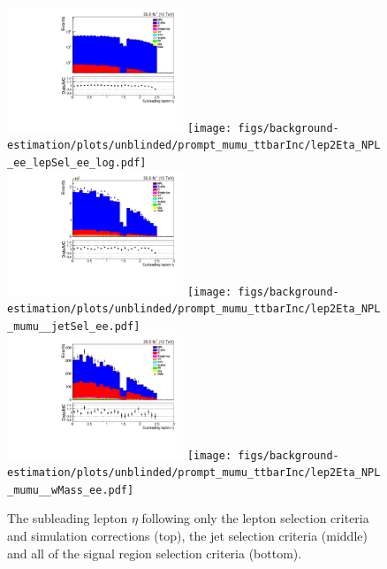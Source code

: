 \begin{figure}[h]
\centering
\includegraphics[width=0.47\textwidth]{figs/background-estimation/plots/unblinded/prompt_ee_ttbarInc/lep2Eta_NPL_ee_lepSel_ee_log.pdf}
\texttt{[image: figs/background-estimation/plots/unblinded/prompt\_mumu\_ttbarInc/lep2Eta\_NPL\_ee\_lepSel\_ee\_log.pdf]}
\\
\includegraphics[width=0.47\textwidth]{figs/background-estimation/plots/unblinded/prompt_ee_ttbarInc/lep2Eta_NPL_ee_jetSel_ee.pdf}
\texttt{[image: figs/background-estimation/plots/unblinded/prompt\_mumu\_ttbarInc/lep2Eta\_NPL\_mumu\_\_jetSel\_ee.pdf]}
\\
\includegraphics[width=0.47\textwidth]{figs/background-estimation/plots/unblinded/prompt_ee_ttbarInc/lep2Eta_NPL_ee_wMass_ee.pdf}
\texttt{[image: figs/background-estimation/plots/unblinded/prompt\_mumu\_ttbarInc/lep2Eta\_NPL\_mumu\_\_wMass\_ee.pdf]}
\caption{
The subleading lepton $\eta$ following only the lepton selection criteria and simulation corrections (top), the jet selection criteria (middle) and all of the signal region selection criteria (bottom).
}
\label{fig:SR_lep2Eta}
\end{figure}



